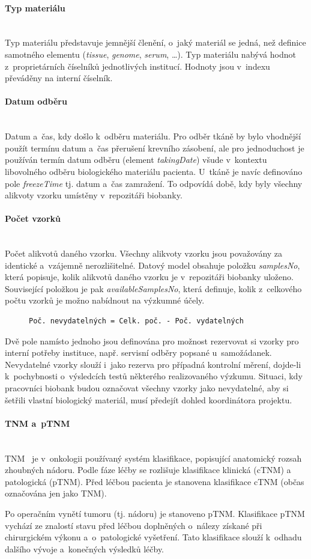 \documentclass[11pt, draft, oneside]{fithesis2}
\newcommand{\paragraphNewLine}[1]{\paragraph*{#1}\mbox{}\\}
\begin{document}
\paragraphNewLine{Typ materiálu}
Typ materiálu představuje jemnější členění, o~jaký materiál se jedná, než definice samotného elementu (\textit{tissue}, \textit{genome}, \textit{serum}, \ldots). Typ materiálu nabývá hodnot z~proprietárních číselníků jednotlivých institucí. Hodnoty jsou v~indexu převáděny na interní číselník.
		
\paragraphNewLine{Datum odběru}
Datum a~čas, kdy došlo k~odběru materiálu. Pro odběr tkáně by bylo vhodnější použít termínu datum a~čas přerušení krevního zásobení, ale pro jednoduchost je používán termín datum odběru (element \textit{takingDate}) všude v~kontextu libovolného odběru biologického materiálu pacienta.
U~tkáně je navíc definováno pole \textit{freezeTime} tj. datum a~čas zamražení. To odpovídá době, kdy byly všechny alikvoty vzorku umístěny v~repozitáři biobanky.

\paragraphNewLine{Počet vzorků}
Počet alikvotů daného vzorku. Všechny alikvoty vzorku jsou považovány za identické a~vzájemně nerozlišitelné. 
Datový model obsahuje položku \textit{samplesNo}, která popisuje, kolik alikvotů daného vzorku je v~repozitáři biobanky uloženo. Související položkou je pak \textit{availableSamplesNo}, která definuje, kolik z~celkového počtu vzorků je možno nabídnout na výzkumné účely.

\begin{figure}[h!] %
\centering
\begin{BVerbatim}
Poč. nevydatelných = Celk. poč. - Poč. vydatelných
\end{BVerbatim}
\end{figure}
Dvě pole namísto jednoho jsou definována pro možnost rezervovat si vzorky pro interní potřeby instituce, např. servisní odběry popsané u~samožádanek. Nevydatelné vzorky slouží i~jako rezerva pro případná kontrolní měrení, dojde-li k~pochybnosti o~výsledcích testů některého realizovaného výzkumu.
Situaci, kdy pracovníci biobank budou označovat všechny vzorky jako nevydatelné, aby si šetřili vlastní biologický materiál, musí předejít dohled koordinátora projektu. 

\paragraphNewLine{TNM a~pTNM}
TNM~\cite{TNM} je v~onkologii používaný systém klasifikace, popisující anatomický rozsah zhoubných nádoru. Podle fáze léčby se rozlišuje klasifikace klinická (cTNM) a patologická (pTNM). Před léčbou pacienta je stanovena klasifikace cTNM (občas označována jen jako TNM).

Po operačním vynětí tumoru (tj. nádoru) je stanoveno pTNM. Klasifikace pTNM vychází ze znalostí stavu před léčbou doplněných o~nálezy získané při chirurgickém výkonu a~o~patologické vyšetření. Tato klasifikace slouží k~odhadu dalšího vývoje a~konečných výsledků léčby. 
\end{document}
